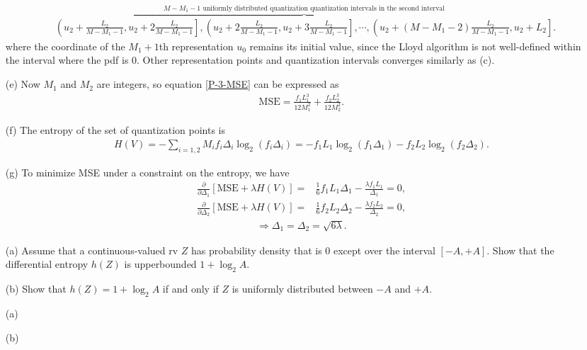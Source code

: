 \documentclass{assignment}
\begin{document}
\begin{sol}
\begin{itemize}
{\begin{align*}
            &\overbrace{\left(u_2+\frac{L_2}{M-M_1-1},u_2+2\frac{L_2}{M-M_1-1}\right],\left(u_2+2\frac{L_2}{M-M_1-1},u_2+3\frac{L_2}{M-M_1-1}\right],\cdots,\left(u_2+(M-M_1-2)\frac{L_2}{M-M_1-1},u_2+L_2\right]}^{M-M_1-1\text{ uniformly distributed quantization quantization intervals in the second interval}}.
        \end{align*}
        }%
        where the coordinate of the $M_1+1$th representation $u_0$ remains its initial value, since the Lloyd algorithm is not well-defined within the interval where the pdf is $0$. Other representation points and quantization intervals converges similarly as (c).
        \item[(e)] Now $M_1$ and $M_2$ are integers, so equation \ref{P-3-MSE} can be expressed as
        \begin{align}
            \text{MSE}=\frac{f_1L_1^3}{12M_1^2}+\frac{f_2L_2^3}{12M_2^2}.
        \end{align}
        \item[(f)] The entropy of the set of quantization points is
        \begin{align}
            H(V)=-\sum_{i=1,2}M_if_i\Delta_i\log_2(f_i\Delta_i)=-f_1L_1\log_2(f_1\Delta_1)-f_2L_2\log_2(f_2\Delta_2).
        \end{align}
        \item[(g)] To minimize MSE under a constraint on the entropy, we have
        \begin{align}
            \frac{\partial}{\partial\Delta_1}[\text{MSE}+\lambda H(V)]=&\frac{1}{6}f_1L_1\Delta_1-\frac{\lambda f_1L_1}{\Delta_1}=0,\\
            \frac{\partial}{\partial\Delta_2}[\text{MSE}+\lambda H(V)]=&\frac{1}{6}f_2L_2\Delta_2-\frac{\lambda f_2L_2}{\Delta_2}=0,
        \end{align}
        \begin{align}
            \Longrightarrow\Delta_1=\Delta_2=\sqrt{6\lambda}.
        \end{align}
    \end{itemize}
\end{sol}

\begin{prob}[3.5]
    \begin{itemize}
        \item[(a)] Assume that a continuous-valued rv $Z$ has probability density that is $0$ except over the interval $[-A,+A]$. Show that the differential entropy $h(Z)$ is upperbounded $1+\log_2A$.
        \item[(b)] Show that $h(Z)=1+\log_2A$ if and only if $Z$ is uniformly distributed between $-A$ and $+A$.
    \end{itemize}
\end{prob}
\begin{sol}
    \begin{itemize}
        \item[(a)] 
        \item[(b)] 
    \end{itemize}
\end{sol}
\end{document}
